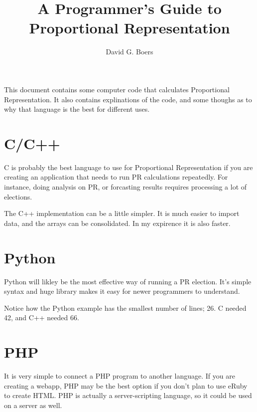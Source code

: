 \documentclass{article}
\title{A Programmer's Guide to Proportional Representation}
\author{David G. Boers}
\begin{document}
    \maketitle
    This document contains some computer code that calculates Proportional Representation. It also contains explinations of the code, and some thoughs as to why that language is the best for different uses. 
    
    \section{C/C++}
    C is probably the best language to use for Proportional Representation if you are creating an application that needs to run PR calculations repeatedly. For instance, doing analysis on PR, or forcasting results requires processing a lot of elections. 

    

    The C++ implementation can be a little simpler. It is much easier to import data, and the arrays can be consolidated. In my expirence it is also faster.

    

    \section{Python}

    Python will likley be the most effective way of running a PR election. It's simple syntax and huge library makes it easy for newer programmers to understand.

    

    Notice how the Python example has the smallest number of lines; 26. C needed 42, and C++ needed 66.

    \section{PHP}

    It is very simple to connect a PHP program to another language. If you are creating a webapp, PHP may be the best option if you don't plan to use eRuby to create HTML. PHP is actually a server-scripting language, so it could be used on a server as well. 

    
\end{document}
